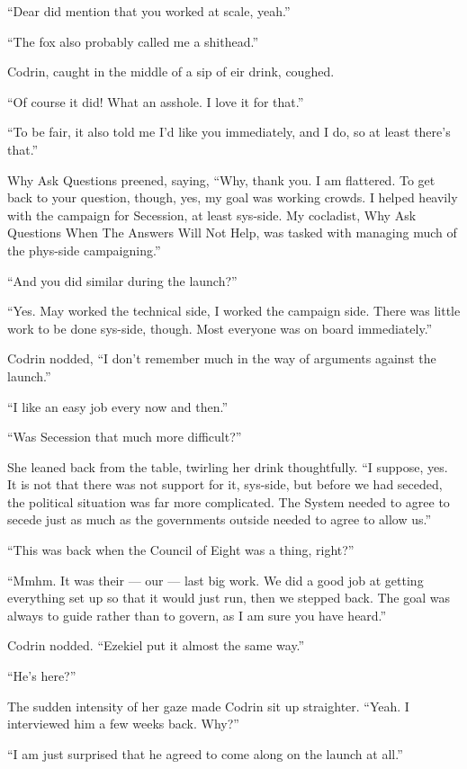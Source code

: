 ``Dear did mention that you worked at scale, yeah.''

``The fox also probably called me a shithead.''

Codrin, caught in the middle of a sip of eir drink, coughed.

``Of course it did! What an asshole. I love it for that.''

``To be fair, it also told me I'd like you immediately, and I do, so at least there's that.''

Why Ask Questions preened, saying, ``Why, thank you. I am flattered. To get back to your question, though, yes, my goal was working crowds. I helped heavily with the campaign for Secession, at least sys-side. My cocladist, Why Ask Questions When The Answers Will Not Help, was tasked with managing much of the phys-side campaigning.''

``And you did similar during the launch?''

``Yes. May worked the technical side, I worked the campaign side. There was little work to be done sys-side, though. Most everyone was on board immediately.''

Codrin nodded, ``I don't remember much in the way of arguments against the launch.''

``I like an easy job every now and then.''

``Was Secession that much more difficult?''

She leaned back from the table, twirling her drink thoughtfully. ``I suppose, yes. It is not that there was not support for it, sys-side, but before we had seceded, the political situation was far more complicated. The System needed to agree to secede just as much as the governments outside needed to agree to allow us.''

``This was back when the Council of Eight was a thing, right?''

``Mmhm. It was their — our — last big work. We did a good job at getting everything set up so that it would just run, then we stepped back. The goal was always to guide rather than to govern, as I am sure you have heard.''

Codrin nodded. ``Ezekiel put it almost the same way.''

``He's here?''

The sudden intensity of her gaze made Codrin sit up straighter. ``Yeah. I interviewed him a few weeks back. Why?''

``I am just surprised that he agreed to come along on the launch at all.''

